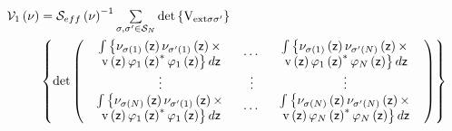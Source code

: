 \documentclass[aps,preprint]{revtex4}%
\begin{document}
\begin{align}
\mathcal{V}_{1}\left(  \nu\right)   &  =\mathcal{S}_{eff}\left(  \nu\right)
^{-1}%
{\textstyle\sum\limits_{\sigma,\sigma^{\prime}\in\mathcal{S}_{N}}}
\det\left\{  \mathrm{V}_{\mathrm{ext}\sigma\sigma^{\prime}}\right\}
\nonumber\\
&  \left\{  \det\left(
\begin{array}
[c]{ccc}%
\begin{array}
[c]{c}%
\int\left\{  \nu_{\sigma\left(  1\right)  }\left(  \mathsf{z}\right)
\nu_{\sigma^{\prime}\left(  1\right)  }\left(  \mathsf{z}\right)
\times\right.  \\
\left.  \mathrm{v}\left(  \mathsf{z}\right)  \varphi_{1}\left(  \mathsf{z}%
\right)  ^{\ast}\varphi_{1}\left(  \mathsf{z}\right)  \right\}  d\mathsf{z}%
\end{array}
& \cdots &
\begin{array}
[c]{c}%
\int\left\{  \nu_{\sigma\left(  1\right)  }\left(  \mathsf{z}\right)
\nu_{\sigma^{\prime}\left(  N\right)  }\left(  \mathsf{z}\right)
\times\right.  \\
\left.  \mathrm{v}\left(  \mathsf{z}\right)  \varphi_{1}\left(  \mathsf{z}%
\right)  ^{\ast}\varphi_{N}\left(  \mathsf{z}\right)  \right\}  d\mathsf{z}%
\end{array}
\\
\vdots & \vdots & \vdots\\%
\begin{array}
[c]{c}%
\int\left\{  \nu_{\sigma\left(  N\right)  }\left(  \mathsf{z}\right)
\nu_{\sigma^{\prime}\left(  1\right)  }\left(  \mathsf{z}\right)
\times\right.  \\
\left.  \mathrm{v}\left(  \mathsf{z}\right)  \varphi_{1}\left(  \mathsf{z}%
\right)  ^{\ast}\varphi_{1}\left(  \mathsf{z}\right)  \right\}  d\mathsf{z}%
\end{array}
& \cdots &
\begin{array}
[c]{c}%
\int\left\{  \nu_{\sigma\left(  N\right)  }\left(  \mathsf{z}\right)
\nu_{\sigma^{\prime}\left(  N\right)  }\left(  \mathsf{z}\right)
\times\right.  \\
\left.  \mathrm{v}\left(  \mathsf{z}\right)  \varphi_{N}\left(  \mathsf{z}%
\right)  ^{\ast}\varphi_{N}\left(  \mathsf{z}\right)  \right\}  d\mathsf{z}%
\end{array}
\end{array}
\right)  \right\}
\end{align}%
\end{document}
